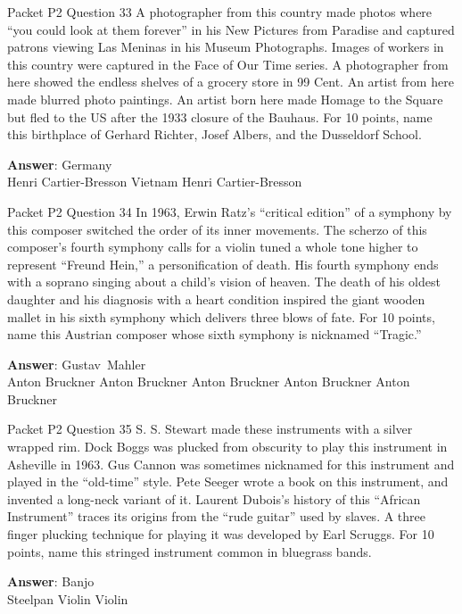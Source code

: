 \begin{frame}{Packet P2 Question 33}
A photographer from this   country made photos   where ``you could look at them forever'' in his New Pictures from Paradise and captured patrons viewing Las Meninas in his Museum Photographs. Images of workers   in this country were captured in the Face   of Our Time series. A photographer from here showed the endless shelves of a grocery store in 99 Cent. An artist from here made blurred photo paintings. An artist born here made Homage to the Square but fled to the US after the 1933 closure of the Bauhaus. For 10 points, name this birthplace of Gerhard Richter, Josef   Albers, and the Dusseldorf School.  

\textbf{Answer}: Germany\\
 Henri Cartier-Bresson
 Vietnam
 Henri Cartier-Bresson
\end{frame}

\begin{frame}{Packet P2 Question 34}
In 1963, Erwin Ratz’s “critical edition” of a symphony by this composer switched the order of its inner movements. The scherzo of this composer’s fourth symphony calls for a violin tuned a whole tone higher to represent “Freund Hein,” a personification of death. His fourth symphony ends with a soprano singing about a child’s vision of heaven. The death of his oldest daughter and his diagnosis with a heart condition inspired the giant wooden mallet in his sixth symphony which delivers   three blows of fate. For 10 points, name this Austrian composer whose sixth     symphony is nicknamed “Tragic.”      

\textbf{Answer}: Gustav\ Mahler\\
 Anton Bruckner
 Anton Bruckner
 Anton Bruckner
 Anton Bruckner
 Anton Bruckner
\end{frame}

\begin{frame}{Packet P2 Question 35}
S. S. Stewart made these instruments with   a silver wrapped rim. Dock Boggs was plucked from obscurity to play this instrument in Asheville in   1963. Gus Cannon was sometimes nicknamed for this instrument and played in the “old-time” style. Pete Seeger wrote a book   on this instrument, and invented a long-neck variant of it. Laurent Dubois’s history of this “African Instrument” traces its origins from the “rude guitar” used by slaves. A three finger plucking technique for playing it was developed by Earl Scruggs. For 10 points, name this stringed instrument common in bluegrass bands.    

\textbf{Answer}: Banjo\\
 Steelpan
 Violin
 Violin
\end{frame}

